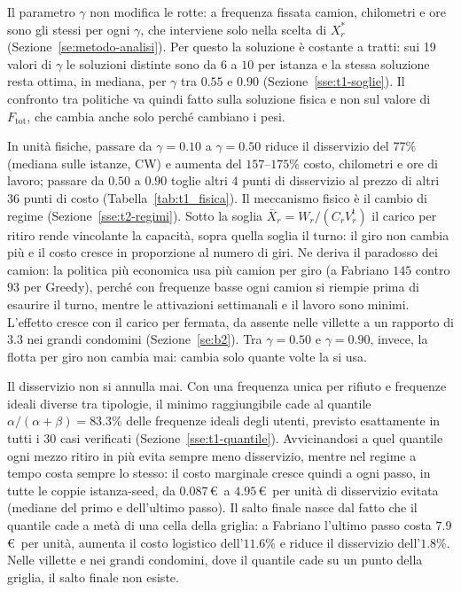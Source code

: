 Il parametro $\gamma$ non modifica le rotte: a frequenza fissata camion, chilometri e ore sono gli stessi per ogni $\gamma$, che interviene solo nella scelta di $X_r^*$ (Sezione~\ref{se:metodo-analisi}). Per questo la soluzione è costante a tratti: sui 19 valori di $\gamma$ le soluzioni distinte sono da $6$ a $10$ per istanza e la stessa soluzione resta ottima, in mediana, per $\gamma$ tra $0.55$ e $0.90$ (Sezione~\ref{sse:t1-soglie}). Il confronto tra politiche va quindi fatto sulla soluzione fisica e non sul valore di $F_{\mathrm{tot}}$, che cambia anche solo perché cambiano i pesi.

In unità fisiche, passare da $\gamma=0.10$ a $\gamma=0.50$ riduce il disservizio del $77\%$ (mediana sulle istanze, CW) e aumenta del $157$--$175\%$ costo, chilometri e ore di lavoro; passare da $0.50$ a $0.90$ toglie altri $4$ punti di disservizio al prezzo di altri $36$ punti di costo (Tabella~\ref{tab:t1_fisica}). Il meccanismo fisico è il cambio di regime (Sezione~\ref{sse:t2-regimi}). Sotto la soglia $\bar X_r=W_r/(C_rV^{\mathrm{t}}_r)$ il carico per ritiro rende vincolante la capacità, sopra quella soglia il turno: il giro non cambia più e il costo cresce in proporzione al numero di giri. Ne deriva il paradosso dei camion: la politica più economica usa più camion per giro (a Fabriano $145$ contro $93$ per Greedy), perché con frequenze basse ogni camion si riempie prima di esaurire il turno, mentre le attivazioni settimanali e il lavoro sono minimi. L'effetto cresce con il carico per fermata, da assente nelle villette a un rapporto di $3.3$ nei grandi condomini (Sezione~\ref{se:b2}). Tra $\gamma=0.50$ e $\gamma=0.90$, invece, la flotta per giro non cambia mai: cambia solo quante volte la si usa.

Il disservizio non si annulla mai. Con una frequenza unica per rifiuto e frequenze ideali diverse tra tipologie, il minimo raggiungibile cade al quantile $\alpha/(\alpha+\beta)=83.3\%$ delle frequenze ideali degli utenti, previsto esattamente in tutti i 30 casi verificati (Sezione~\ref{sse:t1-quantile}). Avvicinandosi a quel quantile ogni mezzo ritiro in più evita sempre meno disservizio, mentre nel regime a tempo costa sempre lo stesso: il costo marginale cresce quindi a ogni passo, in tutte le coppie istanza-seed, da $0.087$\,\euro\ a $4.95$\,\euro\ per unità di disservizio evitata (mediane del primo e dell'ultimo passo). Il salto finale nasce dal fatto che il quantile cade a metà di una cella della griglia: a Fabriano l'ultimo passo costa $7.9$\,\euro\ per unità, aumenta il costo logistico dell'$11.6\%$ e riduce il disservizio dell'$1.8\%$. Nelle villette e nei grandi condomini, dove il quantile cade su un punto della griglia, il salto finale non esiste.


